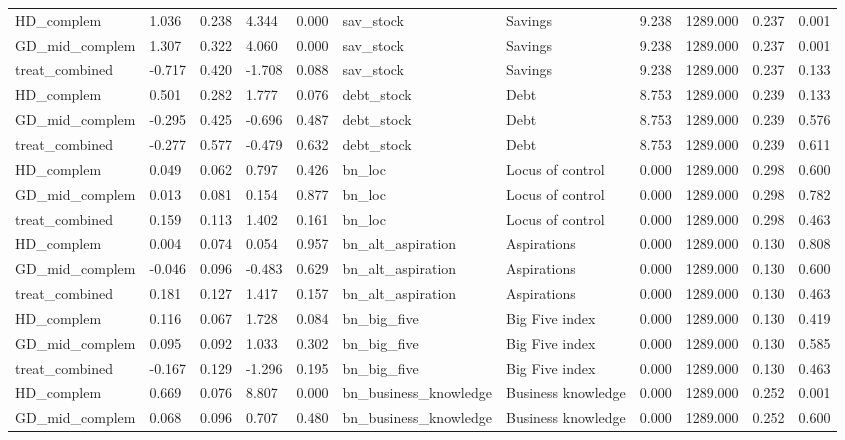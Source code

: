 \begin{tabular}{lllllllllll}
HD\_complem & 1.036 & 0.238 & 4.344 & 0.000 & sav\_stock & Savings & 9.238 & 1289.000 & 0.237 & 0.001 \\
GD\_mid\_complem & 1.307 & 0.322 & 4.060 & 0.000 & sav\_stock & Savings & 9.238 & 1289.000 & 0.237 & 0.001 \\
treat\_combined & -0.717 & 0.420 & -1.708 & 0.088 & sav\_stock & Savings & 9.238 & 1289.000 & 0.237 & 0.133 \\
HD\_complem & 0.501 & 0.282 & 1.777 & 0.076 & debt\_stock & Debt & 8.753 & 1289.000 & 0.239 & 0.133 \\
GD\_mid\_complem & -0.295 & 0.425 & -0.696 & 0.487 & debt\_stock & Debt & 8.753 & 1289.000 & 0.239 & 0.576 \\
treat\_combined & -0.277 & 0.577 & -0.479 & 0.632 & debt\_stock & Debt & 8.753 & 1289.000 & 0.239 & 0.611 \\
HD\_complem & 0.049 & 0.062 & 0.797 & 0.426 & bn\_loc & Locus of control & 0.000 & 1289.000 & 0.298 & 0.600 \\
GD\_mid\_complem & 0.013 & 0.081 & 0.154 & 0.877 & bn\_loc & Locus of control & 0.000 & 1289.000 & 0.298 & 0.782 \\
treat\_combined & 0.159 & 0.113 & 1.402 & 0.161 & bn\_loc & Locus of control & 0.000 & 1289.000 & 0.298 & 0.463 \\
HD\_complem & 0.004 & 0.074 & 0.054 & 0.957 & bn\_alt\_aspiration & Aspirations & 0.000 & 1289.000 & 0.130 & 0.808 \\
GD\_mid\_complem & -0.046 & 0.096 & -0.483 & 0.629 & bn\_alt\_aspiration & Aspirations & 0.000 & 1289.000 & 0.130 & 0.600 \\
treat\_combined & 0.181 & 0.127 & 1.417 & 0.157 & bn\_alt\_aspiration & Aspirations & 0.000 & 1289.000 & 0.130 & 0.463 \\
HD\_complem & 0.116 & 0.067 & 1.728 & 0.084 & bn\_big\_five & Big Five index & 0.000 & 1289.000 & 0.130 & 0.419 \\
GD\_mid\_complem & 0.095 & 0.092 & 1.033 & 0.302 & bn\_big\_five & Big Five index & 0.000 & 1289.000 & 0.130 & 0.585 \\
treat\_combined & -0.167 & 0.129 & -1.296 & 0.195 & bn\_big\_five & Big Five index & 0.000 & 1289.000 & 0.130 & 0.463 \\
HD\_complem & 0.669 & 0.076 & 8.807 & 0.000 & bn\_business\_knowledge & Business knowledge & 0.000 & 1289.000 & 0.252 & 0.001 \\
GD\_mid\_complem & 0.068 & 0.096 & 0.707 & 0.480 & bn\_business\_knowledge & Business knowledge & 0.000 & 1289.000 & 0.252 & 0.600 \\

\end{tabular}
